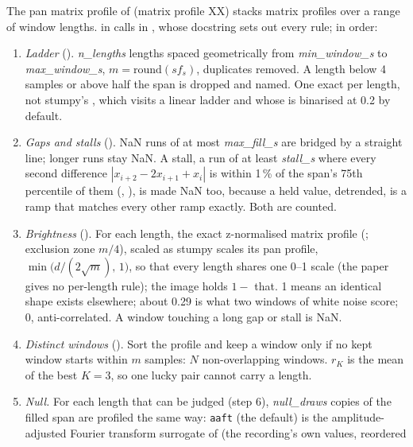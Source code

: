 The pan matrix profile of \citet{madrid2019matrix} (matrix profile XX) stacks matrix profiles over a
range of window lengths.  in  calls
 in , whose docstring sets
out every rule; in order:
\begin{enumerate}
\item \emph{Ladder} (). \emph{n\_lengths} lengths spaced geometrically from
  \emph{min\_window\_s} to \emph{max\_window\_s}, $m = \mathrm{round}(s f_s)$, duplicates removed. A
  length below 4 samples or above half the span is dropped and named. One exact
   per length, not stumpy's , which visits a linear ladder and whose
   is binarised at 0.2 by default.
\item \emph{Gaps and stalls} (). NaN runs of at most \emph{max\_fill\_s} are
  bridged by a straight line; longer runs stay NaN. A stall, a run of at least \emph{stall\_s} where
  every second difference $|x_{i+2} - 2x_{i+1} + x_i|$ is within 1\,\% of the span's 75th percentile
  of them (, ), is made NaN too, because a held value, detrended,
  is a ramp that matches every other ramp exactly. Both are counted.
\item \emph{Brightness} (). For each length, the exact z-normalised
  matrix profile (; exclusion zone $m/4$), scaled as stumpy
  scales its pan profile, $\min\bigl(d/(2\sqrt m),\,1\bigr)$, so that every length shares one 0--1
  scale (the paper gives no per-length rule); the image holds $1 -$ that. 1 means an identical shape
  exists elsewhere; about 0.29 is what two windows of white noise score; 0, anti-correlated. A
  window touching a long gap or stall is NaN.
\item \emph{Distinct windows} (). Sort the profile and keep a window only if no
  kept window starts within $m$ samples: $N$ non-overlapping windows. $r_K$ is the mean of the best
  $K = 3$, so one lucky pair cannot carry a length.
\item \emph{Null.} For each length that can be judged (step 6), \emph{null\_draws} copies of the
  filled span are profiled the same way: \texttt{aaft} (the default) is the amplitude-adjusted
  Fourier transform surrogate of \citet{theiler1992testing} (the recording's own values, reordered

\end{enumerate}

